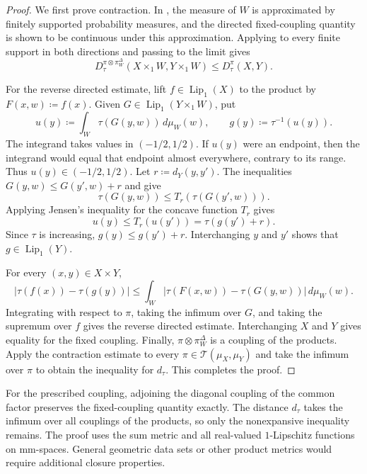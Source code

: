\documentclass[10pt,a4paper]{amsart}
\newcommand{\T}{\mathcal T}
\newcommand{\dtau}{d_{\tau}}
\begin{document}
\begin{proof}
We first prove contraction. In , the measure of $W$ is approximated by finitely supported probability measures, and the directed fixed-coupling quantity is shown to be continuous under this approximation. Applying  to every finite support in both directions and passing to the limit gives
\[
D_\tau^{\pi\otimes\pi_W^\Delta}(X\times_1W,Y\times_1W)\leq D_\tau^\pi(X,Y).
\]

For the reverse directed estimate, lift $f\in\operatorname{Lip}_1(X)$ to the product by $F(x,w)\coloneqq f(x)$. Given $G\in\operatorname{Lip}_1(Y\times_1W)$, put
\[
u(y)\coloneqq\int_W\tau(G(y,w))\,d\mu_W(w),\qquad g(y)\coloneqq\tau^{-1}(u(y)).
\]
The integrand takes values in $(-1/2,1/2)$. If $u(y)$ were an endpoint, then the integrand would equal that endpoint almost everywhere, contrary to its range. Thus $u(y)\in(-1/2,1/2)$. Let $r\coloneqq d_Y(y,y')$. The inequalities $G(y,w)\leq G(y',w)+r$ and  give
\[
\tau(G(y,w))\leq T_r(\tau(G(y',w))).
\]
Applying Jensen's inequality for the concave function $T_r$ \cite[Section~1.2.1, Equation~(1.2.1), p.~10]{bakry-gentil-ledoux2014markov} gives
\[
u(y)\leq T_r(u(y'))=\tau(g(y')+r).
\]
Since $\tau$ is increasing, $g(y)\leq g(y')+r$. Interchanging $y$ and $y'$ shows that $g\in\operatorname{Lip}_1(Y)$.

For every $(x,y)\in X\times Y$,
\[
|\tau(f(x))-\tau(g(y))|\leq\int_W|\tau(F(x,w))-\tau(G(y,w))|\,d\mu_W(w).
\]
Integrating with respect to $\pi$, taking the infimum over $G$, and taking the supremum over $f$ gives the reverse directed estimate. Interchanging $X$ and $Y$ gives equality for the fixed coupling. Finally, $\pi\otimes\pi_W^\Delta$ is a coupling of the products. Apply the contraction estimate to every $\pi\in\T(\mu_X,\mu_Y)$ and take the infimum over $\pi$ to obtain the inequality for $\dtau$. This completes the proof.
\end{proof}

For the prescribed coupling, adjoining the diagonal coupling of the common factor preserves the fixed-coupling quantity exactly. The distance $\dtau$ takes the infimum over all couplings of the products, so only the nonexpansive inequality remains. The proof uses the sum metric and all real-valued $1$-Lipschitz functions on mm-spaces. General geometric data sets or other product metrics would require additional closure properties.

\appendix
\end{document}
